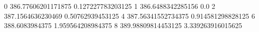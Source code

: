 0 386.77606201171875 0.127227783203125
1 386.6488342285156 0.0
2 387.1564636230469 0.50762939453125
4 387.56341552734375 0.914581298828125
6 388.6083984375 1.959564208984375
8 389.98809814453125 3.339263916015625
